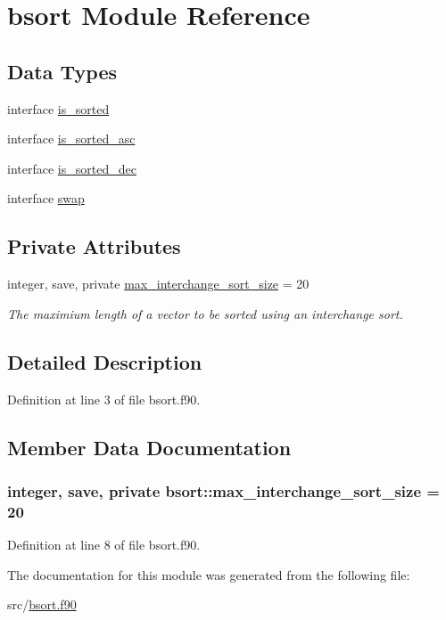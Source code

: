 \hypertarget{classbsort}{\section{bsort Module Reference}
\label{classbsort}
}
\subsection*{Data Types}
\begin{DoxyCompactItemize}
\item 
interface \hyperlink{interfacebsort_1_1is__sorted}{is\-\_\-sorted}
\item 
interface \hyperlink{interfacebsort_1_1is__sorted__asc}{is\-\_\-sorted\-\_\-asc}
\item 
interface \hyperlink{interfacebsort_1_1is__sorted__dec}{is\-\_\-sorted\-\_\-dec}
\item 
interface \hyperlink{interfacebsort_1_1swap}{swap}
\end{DoxyCompactItemize}
\subsection*{Private Attributes}
\begin{DoxyCompactItemize}
\item 
integer, save, private \hyperlink{classbsort_a7c8d6b5536a6d01dd6e51f7c71dcfe57_a7c8d6b5536a6d01dd6e51f7c71dcfe57}{max\-\_\-interchange\-\_\-sort\-\_\-size} = 20
\begin{DoxyCompactList}\small\item\em The maximium length of a vector to be sorted using an interchange sort. \end{DoxyCompactList}\end{DoxyCompactItemize}


\subsection{Detailed Description}


Definition at line 3 of file bsort.\-f90.



\subsection{Member Data Documentation}
\hypertarget{classbsort_a7c8d6b5536a6d01dd6e51f7c71dcfe57_a7c8d6b5536a6d01dd6e51f7c71dcfe57}{
\subsubsection[{max\-\_\-interchange\-\_\-sort\-\_\-size}]{\setlength{\rightskip}{0pt plus 5cm}integer, save, private bsort\-::max\-\_\-interchange\-\_\-sort\-\_\-size = 20\hspace{0.3cm}{\ttfamily [private]}}}\label{classbsort_a7c8d6b5536a6d01dd6e51f7c71dcfe57_a7c8d6b5536a6d01dd6e51f7c71dcfe57}


Definition at line 8 of file bsort.\-f90.



The documentation for this module was generated from the following file\-:\begin{DoxyCompactItemize}
\item 
src/\hyperlink{bsort_8f90}{bsort.\-f90}\end{DoxyCompactItemize}
